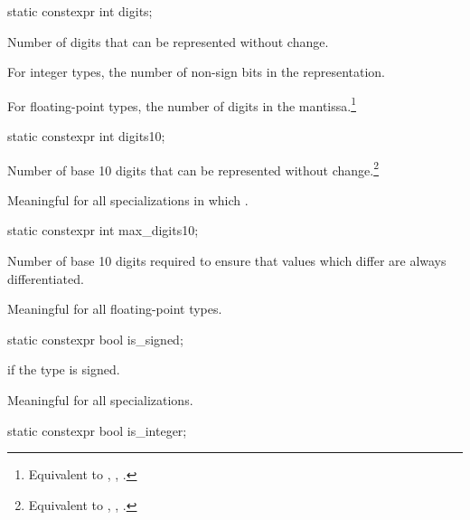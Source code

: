%
\begin{itemdecl}
static constexpr int digits;
\end{itemdecl}

\begin{itemdescr}
\pnum
Number of
digits that can be represented without change.

\pnum
For integer types, the number of non-sign bits in the representation.

\pnum
For floating-point types, the number of  digits in the
mantissa.\footnote{Equivalent to , ,
.} \end{itemdescr}

%
\begin{itemdecl}
static constexpr int digits10;
\end{itemdecl}

\begin{itemdescr}
\pnum
Number of base 10 digits that can be represented without
change.\footnote{Equivalent to , ,
.}

\pnum
Meaningful for all specializations in which
.
\end{itemdescr}

%
\begin{itemdecl}
static constexpr int max_digits10;
\end{itemdecl}

\begin{itemdescr}
\pnum
Number of base 10 digits required to ensure that values which
differ are always differentiated.

\pnum
Meaningful for all floating-point types.
\end{itemdescr}

%
\begin{itemdecl}
static constexpr bool is_signed;
\end{itemdecl}

\begin{itemdescr}
\pnum
{} if the type is signed.

\pnum
Meaningful for all specializations.
\end{itemdescr}

%
\begin{itemdecl}
static constexpr bool is_integer;
\end{itemdecl}

